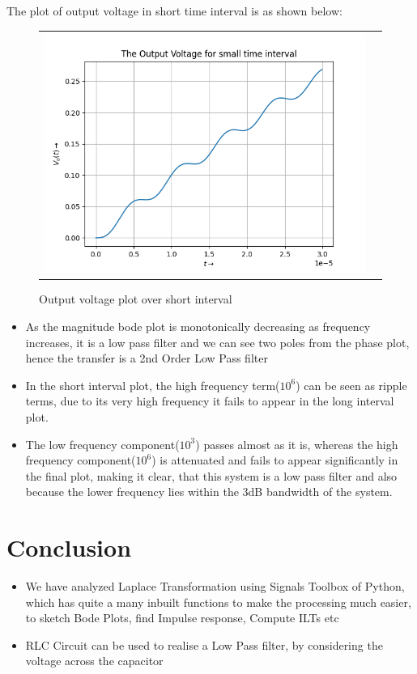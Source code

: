 \documentclass[11pt, a4paper]{article}
\begin{document}
              The plot of output voltage in short time interval is as shown below:
      		  \begin{figure}[H]
                    \centering
                    \setlength\tabcolsep{2pt}
                    \begin{tabular}{cc}
                       \includegraphics[scale=0.85]{Figure 6b.png}
                    \end{tabular}
                    \caption{Output voltage plot over short interval} 
                \end{figure}
    
   		\begin{itemize}
   		\item 
   		As the magnitude bode plot is monotonically decreasing as frequency increases, it is a low pass filter and we can see two poles from the phase plot, hence the transfer is a 2nd Order Low Pass filter
		\item
		In the short interval plot, the high frequency term($10^6$) can be seen as ripple terms, due to its very high frequency it fails to appear in the long interval plot.
		\item
		The low frequency component($10^3$) passes almost as it is, whereas the high frequency component($10^6$) is attenuated and fails to appear significantly in the final plot, making it clear, that this system is a low pass filter and also because the lower frequency lies within the 3dB bandwidth of the system.

		\end{itemize}

    \section{Conclusion}
    \begin{itemize}
    \item
    We have analyzed Laplace Transformation using Signals Toolbox of Python, which has quite a many inbuilt functions to make the processing much easier, to sketch Bode Plots, find Impulse response, Compute ILTs etc
    
    \item
    RLC Circuit can be used to realise a Low Pass filter, by considering the voltage across the capacitor     
    \end{itemize}    
\end{document}
